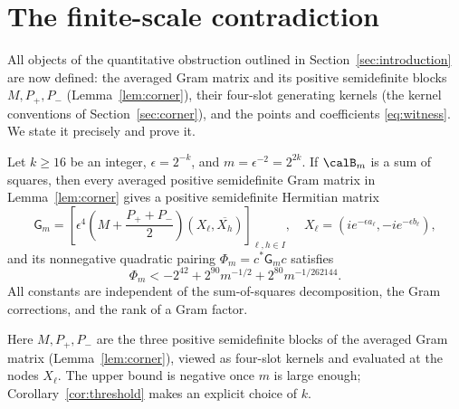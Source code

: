 \section{The finite-scale contradiction}\label{sec:finish}

All objects of the quantitative obstruction outlined in
Section~\ref{sec:introduction} are now defined: the averaged Gram matrix
and its positive semidefinite blocks $M,P_+,P_-$
(Lemma~\ref{lem:corner}), their four-slot generating kernels
(the kernel conventions of Section~\ref{sec:corner}), and the points and coefficients
\eqref{eq:witness}. We state it precisely and prove it.

\begin{theorem}\label{thm:finite-scale}
Let $k\ge16$ be an integer, $\epsilon=2^{-k}$, and
$m=\epsilon^{-2}=2^{2k}$. If $\calB_m$ is a sum of squares, then every
averaged positive semidefinite Gram matrix in
Lemma~\ref{lem:corner} gives a positive semidefinite Hermitian matrix
\begin{equation}\label{eq:nodes}
 \mathsf G_m=\left[\epsilon^4
 \left(M+\frac{P_++P_-}{2}\right)(X_\ell,\overline{X_h})\right]_{\ell,h\in I},
 \quad X_\ell=(i e^{-\epsilon a_\ell},-i e^{-\epsilon b_\ell}),
\end{equation}
and its nonnegative quadratic pairing $\Phi_m=c^*\mathsf G_mc$ satisfies
\begin{equation}\label{eq:finite-scale}
 \boxed{\quad\Phi_m<-2^{42}+2^{90}m^{-1/2}
                           +2^{80}m^{-1/262144}.\quad}
\end{equation}
All constants are independent of the sum-of-squares decomposition,
the Gram corrections, and the rank of a Gram factor.
\end{theorem}

Here $M,P_+,P_-$ are the three positive semidefinite blocks of the
averaged Gram matrix (Lemma~\ref{lem:corner}), viewed as four-slot
kernels and evaluated at the nodes $X_\ell$. The upper bound is negative
once $m$ is large enough; Corollary~\ref{cor:threshold} makes an explicit
choice of $k$.

